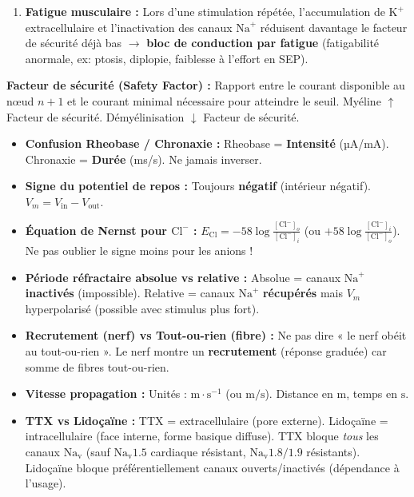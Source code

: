 \documentclass[11pt]{article}
\begin{document}
\begin{exercice}
\begin{enumerate}
\begin{enumerate}
\item \textbf{Fatigue musculaire :} Lors d'une stimulation répétée, l'accumulation de $\text{K}^+$ extracellulaire et l'inactivation des canaux $\text{Na}^+$ réduisent davantage le facteur de sécurité déjà bas $\to$ \textbf{bloc de conduction par fatigue} (fatigabilité anormale, ex: ptosis, diplopie, faiblesse à l'effort en SEP).
\end{enumerate}
\par \textbf{Facteur de sécurité (Safety Factor) :} Rapport entre le courant disponible au nœud $n+1$ et le courant minimal nécessaire pour atteindre le seuil. Myéline $\uparrow$ Facteur de sécurité. Démyélinisation $\downarrow$ Facteur de sécurité.
\end{enumerate}
\end{exercice}

\begin{attention}
\begin{itemize}
\item \textbf{Confusion Rheobase / Chronaxie :} Rheobase = \textbf{Intensité} (µA/mA). Chronaxie = \textbf{Durée} (ms/s). Ne jamais inverser.
\item \textbf{Signe du potentiel de repos :} Toujours \textbf{négatif} (intérieur négatif). $V_m = V_{\text{in}} - V_{\text{out}}$.
\item \textbf{Équation de Nernst pour $\text{Cl}^-$ :} $E_{\text{Cl}} = -58 \log \frac{[\text{Cl}^-]_o}{[\text{Cl}^-]_i}$ (ou $+58 \log \frac{[\text{Cl}^-]_i}{[\text{Cl}^-]_o}$). Ne pas oublier le signe moins pour les anions !
\item \textbf{Période réfractaire absolue vs relative :} Absolue = canaux $\text{Na}^+$ \textbf{inactivés} (impossible). Relative = canaux $\text{Na}^+$ \textbf{récupérés} mais $V_m$ hyperpolarisé (possible avec stimulus plus fort).
\item \textbf{Recrutement (nerf) vs Tout-ou-rien (fibre) :} Ne pas dire « le nerf obéit au tout-ou-rien ». Le nerf montre un \textbf{recrutement} (réponse graduée) car somme de fibres tout-ou-rien.
\item \textbf{Vitesse propagation :} Unités : $\text{m}\cdot\text{s}^{-1}$ (ou $\text{m/s}$). Distance en $\text{m}$, temps en $\text{s}$.
\item \textbf{TTX vs Lidoçaïne :} TTX = extracellulaire (pore externe). Lidoçaïne = intracellulaire (face interne, forme basique diffuse). TTX bloque \emph{tous} les canaux $\text{Na}_{\text{v}}$ (sauf $\text{Na}_{\text{v}}1.5$ cardiaque résistant, $\text{Na}_{\text{v}}1.8/1.9$ résistants). Lidoçaïne bloque préférentiellement canaux ouverts/inactivés (dépendance à l'usage).
\end{itemize}
\end{attention}
\end{document}
